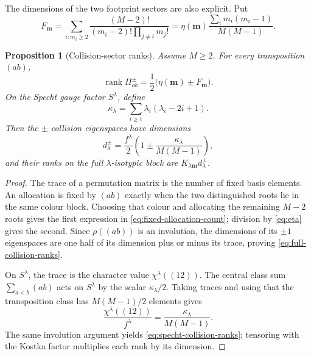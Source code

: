 \documentclass[11pt]{article}
\newtheorem{proposition}[theorem]{Proposition}
\theoremstyle{definition}
\theoremstyle{remark}
\begin{document}
The dimensions of the two footprint sectors are also explicit.  Put
\begin{equation}\label{eq:fixed-allocation-count}
 F_{\boldsymbol m}
 =\sum_{i:m_i\geq2}
   \frac{(M-2)!}{(m_i-2)!\prod_{j\neq i}m_j!}
 =\eta(\boldsymbol m)
   \frac{\sum_i m_i(m_i-1)}{M(M-1)}.
\end{equation}

\begin{proposition}[Collision-sector ranks]\label{prop:collision-ranks}
Assume $M\geq2$.  For every transposition $(ab)$,
\begin{equation}\label{eq:full-collision-ranks}
 \operatorname{rank}\Pi_{ab}^{\pm}
 =\frac12\big(\eta(\boldsymbol m)\pm F_{\boldsymbol m}\big).
\end{equation}
On the Specht gauge factor $S^\lambda$, define
\begin{equation}\label{eq:kappa-lambda}
 \kappa_\lambda
 =\sum_{i\geq1}\lambda_i(\lambda_i-2i+1).
\end{equation}
Then the $\pm$ collision eigenspaces have dimensions
\begin{equation}\label{eq:specht-collision-ranks}
 d_\lambda^\pm
 =\frac{f^\lambda}{2}
  \left(1\pm\frac{\kappa_\lambda}{M(M-1)}\right),
\end{equation}
and their ranks on the full $\lambda$-isotypic block are
$K_{\lambda\boldsymbol m}d_\lambda^\pm$.
\end{proposition}

\begin{proof}
The trace of a permutation matrix is the number of fixed basis elements.  An allocation is fixed by $(ab)$ exactly when the two distinguished roots lie in the same colour block.  Choosing that colour and allocating the remaining $M-2$ roots gives the first expression in \eqref{eq:fixed-allocation-count}; division by \eqref{eq:eta} gives the second.  Since $\rho( (ab))$ is an involution, the dimensions of its $\pm1$ eigenspaces are one half of its dimension plus or minus its trace, proving \eqref{eq:full-collision-ranks}.

On $S^\lambda$, the trace is the character value $\chi^\lambda((12))$.  The central class sum $\sum_{a<b}(ab)$ acts on $S^\lambda$ by the scalar $\kappa_\lambda/2$.  Taking traces and using that the transposition class has $M(M-1)/2$ elements gives
\[
 \frac{\chi^\lambda((12))}{f^\lambda}
 =\frac{\kappa_\lambda}{M(M-1)}.
\]
The same involution argument yields \eqref{eq:specht-collision-ranks}; tensoring with the Kostka factor multiplies each rank by its dimension.
\end{proof}
\end{document}
